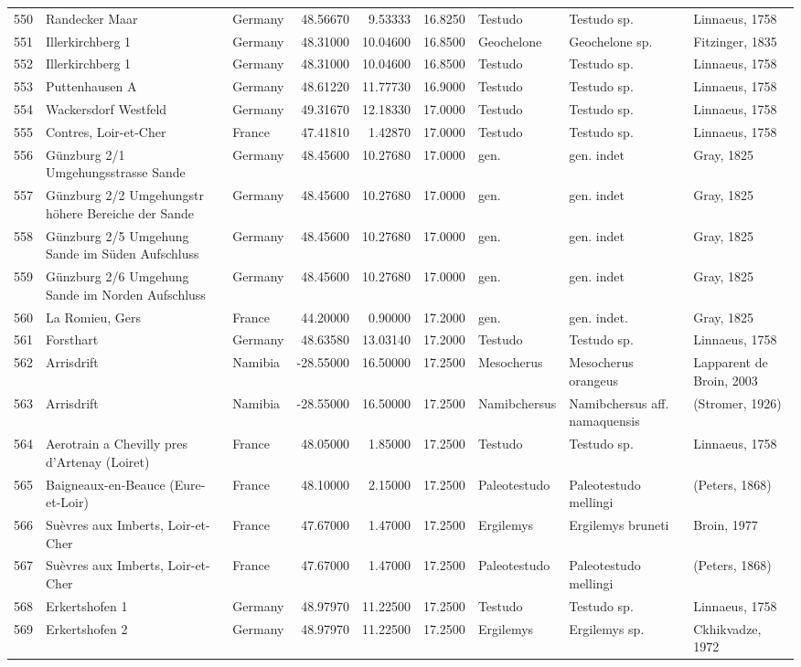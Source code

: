 \documentclass[]{article}
\begin{document}
\begin{longtable}[]{@{}lllrrrlll@{}}
550 & Randecker Maar & Germany & 48.56670 & 9.53333 & 16.8250 & Testudo
& Testudo sp. & Linnaeus, 1758\tabularnewline
551 & Illerkirchberg 1 & Germany & 48.31000 & 10.04600 & 16.8500 &
Geochelone & Geochelone sp. & Fitzinger, 1835\tabularnewline
552 & Illerkirchberg 1 & Germany & 48.31000 & 10.04600 & 16.8500 &
Testudo & Testudo sp. & Linnaeus, 1758\tabularnewline
553 & Puttenhausen A & Germany & 48.61220 & 11.77730 & 16.9000 & Testudo
& Testudo sp. & Linnaeus, 1758\tabularnewline
554 & Wackersdorf Westfeld & Germany & 49.31670 & 12.18330 & 17.0000 &
Testudo & Testudo sp. & Linnaeus, 1758\tabularnewline
555 & Contres, Loir-et-Cher & France & 47.41810 & 1.42870 & 17.0000 &
Testudo & Testudo sp. & Linnaeus, 1758\tabularnewline
556 & Günzburg 2/1 Umgehungsstrasse Sande & Germany & 48.45600 &
10.27680 & 17.0000 & gen. & gen. indet & Gray, 1825\tabularnewline
557 & Günzburg 2/2 Umgehungstr höhere Bereiche der Sande & Germany &
48.45600 & 10.27680 & 17.0000 & gen. & gen. indet & Gray,
1825\tabularnewline
558 & Günzburg 2/5 Umgehung Sande im Süden Aufschluss & Germany &
48.45600 & 10.27680 & 17.0000 & gen. & gen. indet & Gray,
1825\tabularnewline
559 & Günzburg 2/6 Umgehung Sande im Norden Aufschluss & Germany &
48.45600 & 10.27680 & 17.0000 & gen. & gen. indet & Gray,
1825\tabularnewline
560 & La Romieu, Gers & France & 44.20000 & 0.90000 & 17.2000 & gen. &
gen. indet. & Gray, 1825\tabularnewline
561 & Forsthart & Germany & 48.63580 & 13.03140 & 17.2000 & Testudo &
Testudo sp. & Linnaeus, 1758\tabularnewline
562 & Arrisdrift & Namibia & -28.55000 & 16.50000 & 17.2500 & Mesocherus
& Mesocherus orangeus & Lapparent de Broin, 2003\tabularnewline
563 & Arrisdrift & Namibia & -28.55000 & 16.50000 & 17.2500 &
Namibchersus & Namibchersus aff. namaquensis & (Stromer,
1926)\tabularnewline
564 & Aerotrain a Chevilly pres d'Artenay (Loiret) & France & 48.05000 &
1.85000 & 17.2500 & Testudo & Testudo sp. & Linnaeus,
1758\tabularnewline
565 & Baigneaux-en-Beauce (Eure-et-Loir) & France & 48.10000 & 2.15000 &
17.2500 & Paleotestudo & Paleotestudo mellingi & (Peters,
1868)\tabularnewline
566 & Suèvres aux Imberts, Loir-et-Cher & France & 47.67000 & 1.47000 &
17.2500 & Ergilemys & Ergilemys bruneti & Broin, 1977\tabularnewline
567 & Suèvres aux Imberts, Loir-et-Cher & France & 47.67000 & 1.47000 &
17.2500 & Paleotestudo & Paleotestudo mellingi & (Peters,
1868)\tabularnewline
568 & Erkertshofen 1 & Germany & 48.97970 & 11.22500 & 17.2500 & Testudo
& Testudo sp. & Linnaeus, 1758\tabularnewline
569 & Erkertshofen 2 & Germany & 48.97970 & 11.22500 & 17.2500 &
Ergilemys & Ergilemys sp. & Ckhikvadze, 1972\tabularnewline

\end{longtable}
\end{document}
